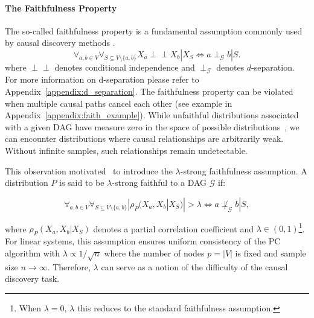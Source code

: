 \paragraph{The Faithfulness Property} 
The so-called faithfulness property is a fundamental assumption commonly used by causal discovery methods \citep{pearl, dcdi}. 
\begin{equation}
    \forall_{a,b \in V} \forall_{S \subseteq V \setminus \{a ,b\}}X_a \perp\!\!\!\perp X_b | X_S \iff a \perp_\mathcal{G} b | S.
\end{equation}
where  $\perp\!\!\!\perp$ denotes conditional independence and $\perp_\mathcal{G}$ denotes $d$-separation. For more information on d-separation please refer to Appendix~\ref{appendix:d_separation}.
The faithfulness property can be violated when multiple causal paths cancel each other (see example in Appendix~\ref{appendix:faith_example}). While unfaithful distributions associated with a given DAG have measure zero in the space of possible distributions~\citep{boeken2025bayesiannetworkstypicallyfaithful}, we can encounter distributions where causal relationships are arbitrarily weak. Without infinite samples, such relationships remain undetectable. 

This observation motivated~\citealp{zhang2003faithfulness} to introduce the $\lambda$-strong faithfulness assumption. %
A distribution $P$ is said to be $\lambda$-strong faithful to a DAG $\mathcal{G}$ if:

\begin{equation}\label{eq:lambda_faith}
    \forall_{a,b \in V} \forall_{S \subseteq V \setminus \{a ,b\}} |\rho_P(X_a, X_b | X_S)| > \lambda \iff a \not\perp_\mathcal{G} b | S,
\end{equation}

where $\rho_P(X_a, X_b | X_S)$ denotes a partial  correlation coefficient and $\lambda \in (0,1)$\footnote{When $\lambda=0$, $\lambda$ this reduces to the standard faithfulness assumption.}.  For linear systems, this assumption ensures uniform consistency of the PC algorithm with $\lambda \propto 1 / \sqrt{n}$ where the number of nodes $p = |V|$ is fixed and sample size $n \rightarrow \infty.$ Therefore, $\lambda$ can serve as a notion of the difficulty of the causal discovery task. 

